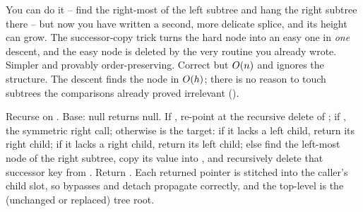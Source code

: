 \begin{thinkbox}
{You can do it -- find the right-most of the left subtree and hang the right subtree there -- but now
you have written a second, more delicate splice, and its height can grow. The successor-copy trick
turns the hard node into an easy one in \emph{one} descent, and the easy node is deleted by the very
routine you already wrote. Simpler and provably order-preserving.}
{Correct but $O(n)$ and ignores the structure. The descent finds the node in $O(h)$; there is
no reason to touch subtrees the comparisons already proved irrelevant ().}
\end{thinkbox}

Recurse on . Base: null returns null. If , re-point
 at the recursive delete of ; if , the symmetric right call;
otherwise  is the target: if it lacks a left child, return its right child; if it lacks a
right child, return its left child; else find the left-most node of the right subtree, copy its value
into , and recursively delete that successor key from . Return
. Each returned pointer is stitched into the caller's child slot, so bypasses and detach
propagate correctly, and the top-level  is the (unchanged or replaced) tree root.

